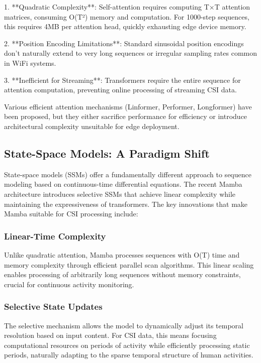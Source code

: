 \documentclass[10pt,journal,compsoc]{IEEEtran}
\begin{document}
1. **Quadratic Complexity**: Self-attention requires computing T×T attention matrices, consuming O(T²) memory and computation. For 1000-step sequences, this requires 4MB per attention head, quickly exhausting edge device memory.

2. **Position Encoding Limitations**: Standard sinusoidal position encodings don't naturally extend to very long sequences or irregular sampling rates common in WiFi systems.

3. **Inefficient for Streaming**: Transformers require the entire sequence for attention computation, preventing online processing of streaming CSI data.

Various efficient attention mechanisms (Linformer, Performer, Longformer) have been proposed, but they either sacrifice performance for efficiency or introduce architectural complexity unsuitable for edge deployment.

\subsection{State-Space Models: A Paradigm Shift}

State-space models (SSMs) offer a fundamentally different approach to sequence modeling based on continuous-time differential equations. The recent Mamba architecture \cite{gu2023mamba} introduces selective SSMs that achieve linear complexity while maintaining the expressiveness of transformers. The key innovations that make Mamba suitable for CSI processing include:

\subsubsection{Linear-Time Complexity}
Unlike quadratic attention, Mamba processes sequences with O(T) time and memory complexity through efficient parallel scan algorithms. This linear scaling enables processing of arbitrarily long sequences without memory constraints, crucial for continuous activity monitoring.

\subsubsection{Selective State Updates}
The selective mechanism allows the model to dynamically adjust its temporal resolution based on input content. For CSI data, this means focusing computational resources on periods of activity while efficiently processing static periods, naturally adapting to the sparse temporal structure of human activities.
\end{document}
